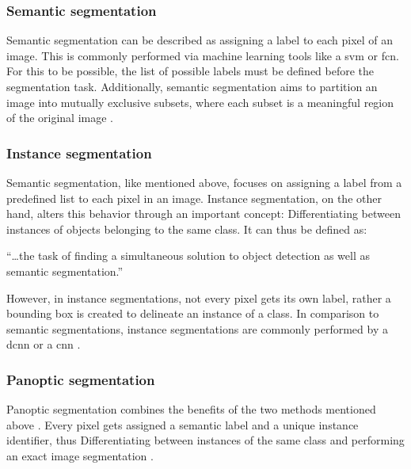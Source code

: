 \subsubsection{Semantic segmentation}
Semantic segmentation can be described as assigning a label to each pixel of an image.
This is commonly performed via machine learning tools like a \acrfull{svm} or \acrfull{fcn}.
For this to be possible, the list of possible labels must be defined before the segmentation task.
Additionally, semantic segmentation aims to partition an image into mutually exclusive subsets,
where each subset is a meaningful region of the original image \cite{haoBriefSurveySemantic2020,longFullyConvolutionalNetworks2015}.

\subsubsection{Instance segmentation}
Semantic segmentation, like mentioned above, focuses on assigning a label from a predefined list to each pixel in an image.
Instance segmentation, on the other hand, alters this behavior through an important concept:
Differentiating between instances of objects belonging to the same class.
It can thus be defined as:
\begin{displayquote}
	``\ldots\space the task of finding a simultaneous solution to object detection as well as semantic segmentation.''
\end{displayquote}
However, in instance segmentations, not every pixel gets its own label, rather a bounding box is created to delineate an instance of a class.
In comparison to semantic segmentations, instance segmentations are commonly performed by a \acrfull{dcnn} or a \acrfull{cnn} \cite{hafizSurveyInstanceSegmentation2020,chenMaskLabInstanceSegmentation2018}.

\subsubsection{Panoptic segmentation}
Panoptic segmentation combines the benefits of the two methods mentioned above
\cite{kirillovPanopticSegmentation2019}.
Every pixel gets assigned a semantic label and a unique instance identifier,
thus Differentiating between instances of the same class and performing an exact image segmentation
\cite{kirillovPanopticSegmentation2019}.

